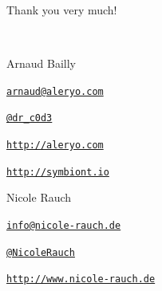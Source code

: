 \begin{frame}{Thank you very much!}

  ~\\[1em]
  \begin{block}{Arnaud Bailly}
        \begin{description}[Twitterxx]
        \item[E-Mail]  \href{mailto:arnaud@aleryo.com}{\texttt{arnaud@aleryo.com}}
        \item[Twitter] \href{http://twitter.com/NicoleRauch}{\texttt{@dr\_c0d3}}
        \item[Web] \href{http://aleryo.com}{\texttt{http://aleryo.com}}
        \item[Web] \href{http://symbiont.io}{\texttt{http://symbiont.io}}
        \end{description}
  \end{block}
  \begin{block}{Nicole Rauch}
    \begin{description}[Twitterxx]
    \item[E-Mail]  \href{mailto:info@nicole-rauch.de}{\texttt{info@nicole-rauch.de}}
    \item[Twitter] \href{http://twitter.com/NicoleRauch}{\texttt{@NicoleRauch}}
    \item[Web] \href{http://www.nicole-rauch.de}{\texttt{http://www.nicole-rauch.de}}
    \end{description}
  \end{block}
\end{frame}

